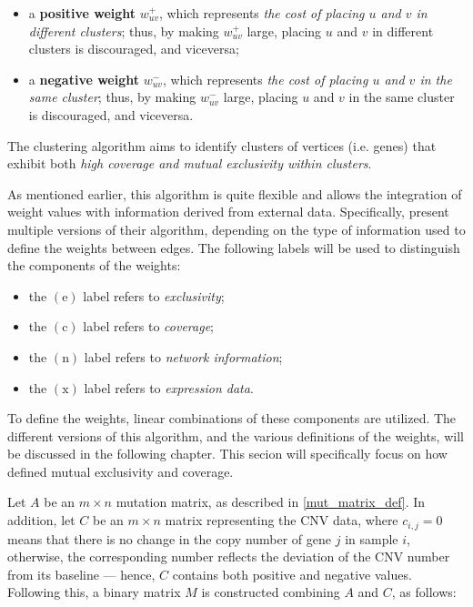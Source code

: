 \begin{itemize}
    \item a \textbf{positive weight} $w_{uv}^+$, which represents \textit{the cost of placing $u$ and $v$ in different clusters}; thus, by making $w_{uv}^+$ large, placing $u$ and $v$ in different clusters is discouraged, and viceversa;
    \item a \textbf{negative weight} $w_{uv}^-$, which represents \textit{the cost of placing $u$ and $v$ in the same cluster}; thus, by making $w_{uv}^-$ large, placing $u$ and $v$ in the same cluster is discouraged, and viceversa.
\end{itemize}

The clustering algorithm aims to identify clusters of vertices (i.e. genes) that exhibit both \textit{high coverage and mutual exclusivity within clusters}.

As mentioned earlier, this algorithm is quite flexible and allows the integration of weight values with information derived from external data. Specifically, \textcite{c3} present multiple versions of their algorithm, depending on the type of information used to define the weights between edges. The following labels will be used to distinguish the components of the weights:

\begin{itemize}
    \item the $(\mathrm e)$ label refers to \textit{exclusivity};
    \item the $(\mathrm c)$ label refers to \textit{coverage};
    \item the $(\mathrm n)$ label refers to \textit{network information};
    \item the $(\mathrm x)$ label refers to \textit{expression data}.
\end{itemize}

To define the weights, linear combinations of these components are utilized. The different versions of this algorithm, and the various definitions of the weights, will be discussed in the following chapter. This secion will specifically focus on how \textcite{c3} defined mutual exclusivity and coverage.

Let $A$ be an $m \times n$ mutation matrix, as described in \cref{mut_matrix_def}. In addition, let $C$ be an $m \times n$ matrix representing the CNV data, where $c_{i, j} = 0$ means that there is no change in the copy number of gene $j$ in sample $i$, otherwise, the corresponding number reflects the deviation of the CNV number from its baseline --- hence, $C$ contains both positive and negative values. Following this, a binary matrix $M$ is constructed combining $A$ and $C$, as follows:

